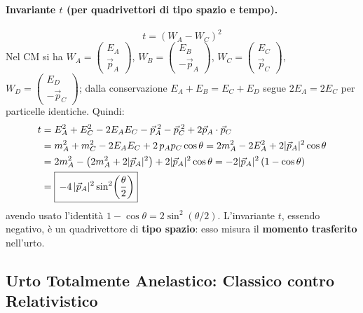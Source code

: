 \paragraph{Invariante $t$ (per quadrivettori di tipo spazio e tempo).}
\begin{equation}
    t = (W_A - W_C)^2
\end{equation}
Nel CM si ha $W_A = \begin{pmatrix} E_A \\ \vec{p}_A \end{pmatrix}$, $W_B = \begin{pmatrix} E_B \\ -\vec{p}_A \end{pmatrix}$, $W_C = \begin{pmatrix} E_C \\ \vec{p}_C \end{pmatrix}$, $W_D = \begin{pmatrix} E_D \\ -\vec{p}_C \end{pmatrix}$; dalla conservazione $E_A + E_B = E_C + E_D$ segue $2E_A = 2E_C$ per particelle identiche. Quindi:
\begin{align}
    t &= E_A^2 + E_C^2 - 2E_AE_C - \vec{p}_A^{\;2} - \vec{p}_C^{\;2} + 2\vec{p}_A \cdot \vec{p}_C \notag \\
      &= m_A^2 + m_C^2 - 2E_AE_C + 2\,p_A p_C \cos\theta
       = 2m_A^2 - 2E_A^2 + 2|\vec{p}_A|^2 \cos\theta \notag \\
      &= 2m_A^2 - \left(2m_A^2 + 2|\vec{p}_A|^2\right) + 2|\vec{p}_A|^2 \cos\theta
       = -2|\vec{p}_A|^2\,(1 - \cos\theta) \notag \\
      &= \boxed{\,-4\,|\vec{p}_A|^2 \sin^2\!\left(\frac{\theta}{2}\right)}
\end{align}
avendo usato l'identità $1 - \cos\theta = 2\sin^2(\theta/2)$. L'invariante $t$, essendo negativo, è un quadrivettore di \textbf{tipo spazio}: esso misura il \textbf{momento trasferito} nell'urto.

\subsection{Urto Totalmente Anelastico: Classico contro Relativistico}

